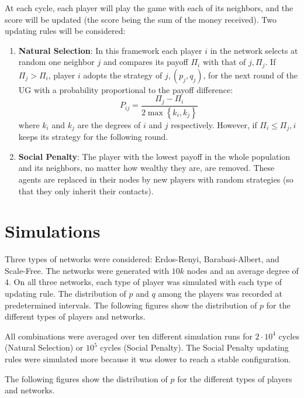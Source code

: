 At each cycle, each player will play the game with each of its neighbors, and the score will be updated (the score being the sum of the money received).
Two updating rules will be considered:
\begin{enumerate}
    \item \textbf{Natural Selection}: In this framework each player $i$ in the network selects at random one neighbor $j$ and compares its payoff $\Pi_i$ with that of $j, \Pi_j$. If $\Pi_j>\Pi_i$, player $i$ adopts the strategy of $j,\left(p_j, q_j\right)$, for the next round of the UG with a probability proportional to the payoff difference: 
    $$ P_{i j}=\frac{\Pi_j-\Pi_i}{2 \max \left\{k_i, k_j\right\}} $$
    where $k_i$ and $k_j$ are the degrees of $i$ and $j$ respectively. However, if $\Pi_i \leq \Pi_j, i$ keeps its strategy for the following round.

    \item \textbf{Social Penalty}: The player with the lowest payoﬀ in the whole population and its neighbors, no matter how wealthy they are, are removed. These agents are replaced in their nodes by new players with random strategies (so that they only inherit their contacts).
\end{enumerate}


\section{Simulations}
Three types of networks were considered: Erdos-Renyi, Barabasi-Albert, and Scale-Free. The networks were generated with $10k$ nodes and an average degree of $4$. On all three networks, each type of player was simulated with each type of updating rule. The distribution of $p$ and $q$ among the players was recorded at predetermined intervals. The following figures show the distribution of $p$ for the different types of players and networks.

All combinations were averaged over ten different simulation runs for $2\cdot 10^4$ cycles (Natural Selection) or $10^5$ cycles (Social Penalty). The Social Penalty updating rules were simulated more because it was slower to reach a stable configuration. 

The following figures show the distribution of $p$ for the different types of players and networks.

